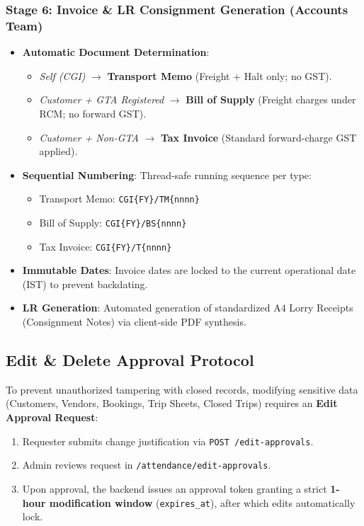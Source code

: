 \documentclass[11pt,a4paper]{article}
\begin{document}
\subsubsection{Stage 6: Invoice \& LR Consignment Generation (Accounts Team)}
\begin{itemize}[leftmargin=1.2em,itemsep=3pt]
  \item \textbf{Automatic Document Determination}:
  \begin{itemize}[leftmargin=1.2em,itemsep=2pt]
    \item \textit{Self (CGI)} $\rightarrow$ \textbf{Transport Memo} (Freight + Halt only; no GST).
    \item \textit{Customer + GTA Registered} $\rightarrow$ \textbf{Bill of Supply} (Freight charges under RCM; no forward GST).
    \item \textit{Customer + Non-GTA} $\rightarrow$ \textbf{Tax Invoice} (Standard forward-charge GST applied).
  \end{itemize}
  \item \textbf{Sequential Numbering}: Thread-safe running sequence per type:
  \begin{itemize}[leftmargin=1.2em,itemsep=2pt]
    \item Transport Memo: \texttt{CGI\{FY\}/TM\{nnnn\}}
    \item Bill of Supply: \texttt{CGI\{FY\}/BS\{nnnn\}}
    \item Tax Invoice: \texttt{CGI\{FY\}/T\{nnnn\}}
  \end{itemize}
  \item \textbf{Immutable Dates}: Invoice dates are locked to the current operational date (IST) to prevent backdating.
  \item \textbf{LR Generation}: Automated generation of standardized A4 Lorry Receipts (Consignment Notes) via client-side PDF synthesis.
\end{itemize}

\subsection{Edit \& Delete Approval Protocol}
To prevent unauthorized tampering with closed records, modifying sensitive data (Customers, Vendors, Bookings, Trip Sheets, Closed Trips) requires an \textbf{Edit Approval Request}:
\begin{enumerate}[leftmargin=1.4em,itemsep=3pt]
  \item Requester submits change justification via \texttt{POST /edit-approvals}.
  \item Admin reviews request in \texttt{/attendance/edit-approvals}.
  \item Upon approval, the backend issues an approval token granting a strict \textbf{1-hour modification window} (\texttt{expires\_at}), after which edits automatically lock.
\end{enumerate}
\end{document}
